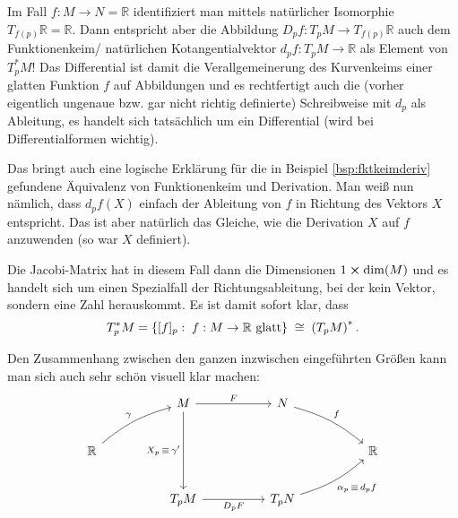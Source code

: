 \documentclass[../H_Analysis_main.tex]{subfiles}
\begin{document}
\begin{bsp}
Im Fall  $f: M \rightarrow N = \mathbb{R}$ identifiziert man mittels natürlicher Isomorphie $T_{f(p)} \mathbb{R} = \mathbb{R}$. Dann entspricht aber die Abbildung $D_p f: T_p M \rightarrow T_{f(p)} \mathbb{R}$ auch dem Funktionenkeim/ natürlichen Kotangentialvektor $d_p f: T_p M \rightarrow \mathbb{R}$ als Element von $T_p^* M$! Das Differential ist damit die Verallgemeinerung des Kurvenkeims einer glatten Funktion $f$ auf Abbildungen und es rechtfertigt auch die (vorher eigentlich ungenaue bzw. gar nicht richtig definierte) Schreibweise mit $d_p$ als Ableitung, es handelt sich tatsächlich um ein Differential (wird bei Differentialformen wichtig).


Das bringt auch eine logische Erklärung für die in Beispiel \ref{bsp:fktkeimderiv} gefundene Äquivalenz von Funktionenkeim und Derivation. Man weiß nun nämlich, dass $d_p f(X)$ einfach der Ableitung von $f$ in Richtung des Vektors $X$ entspricht. Das ist aber natürlich das Gleiche, wie die Derivation $X$ auf $f$ anzuwenden (so war $X$ definiert).


Die Jacobi-Matrix hat in diesem Fall dann die Dimensionen $1 \cross \dim(M)$ und es handelt sich um einen Spezialfall der Richtungsableitung, bei der kein Vektor, sondern eine Zahl herauskommt. Es ist damit sofort klar, dass
\begin{equation}
T^*_p M = \qty{[f]_p: \; f: M \rightarrow \mathbb{R} \text{ glatt}} \; \cong \; \qty(T_p M)^* \, .
\end{equation}
\end{bsp}

Den Zusammenhang zwischen den ganzen inzwischen eingeführten Größen kann man sich auch sehr schön visuell klar machen:
$$
\begin{tikzcd}[row sep = 24, column sep = 50]
& M \arrow[swap]{dd}{X_p \, \equiv \, \gamma'} \arrow{r}{F} & N %
\arrow[bend left = 12]{dr}{f} & \\
\mathbb{R} \arrow[bend left = 12]{ur}{\gamma} &  &  & \mathbb{R} \\
& T_p M  \arrow[swap]{r}{D_p F} & T_p N \arrow[bend right = 12, swap]{ur}{\alpha_p \, \equiv \, d_p f} &
\end{tikzcd}
$$
\end{document}
